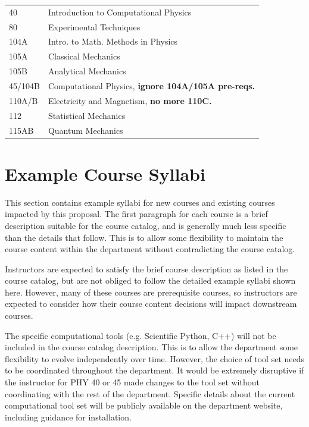 \documentclass[12pt]{article}
\begin{document}
\label{tbl:guide-last}
\begin{center}
\begin{tabular}{|l|l|}
\hline
40 & Introduction to Computational Physics \\ 
80 & Experimental Techniques \\
104A & Intro. to Math. Methods in Physics \\
105A & Classical Mechanics \\
105B & Analytical Mechanics \\
45/104B & Computational Physics, {\bf ignore 104A/105A pre-reqs.} \\
110A/B & Electricity and Magnetism, \bf no more 110C. \\
112 & Statistical Mechanics \\
115AB & Quantum Mechanics \\
\hline
\end{tabular}
\end{center}








\newpage
\section{Example Course Syllabi}
\label{sec:syllabi}

This section contains example syllabi for new courses and existing
courses impacted by this proposal.  The first paragraph for each
course is a brief description suitable for the course catalog, and is
generally much less specific than the details that follow.  This is to
allow some flexibility to maintain the course content within the
department without contradicting the course catalog.

Instructors are expected to satisfy the brief course description as
listed in the course catalog, but are not obliged to follow the
detailed example syllabi shown here.  However, many of these courses
are prerequisite courses, so instructors are expected to consider how
their course content decisions will impact downstream courses.

The specific computational tools (e.g. Scientific Python, C++) will
not be included in the course catalog description.  This is to allow
the department some flexibility to evolve independently over time.
However, the choice of tool set needs to be coordinated throughout the
department.  It would be extremely disruptive if the instructor for
PHY 40 or 45 made changes to the tool set without coordinating with
the rest of the department.  Specific details about the current
computational tool set will be publicly available on the department
website, including guidance for installation.
\end{document}

